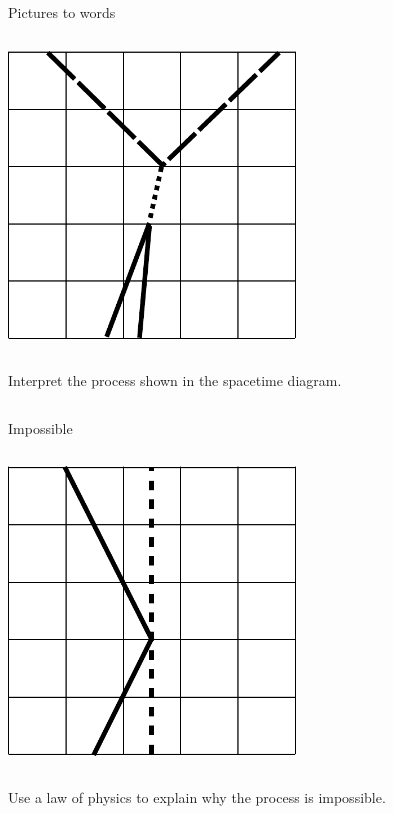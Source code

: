 \begin{frame}{Pictures to words}


  \begin{mycolumns}

    \begin{column}{.3\textwidth}\includegraphics[width=3in]{ch06/figs/to-words-3}\end{column}

    \begin{column}{.7\textwidth}

      Interpret the process shown in the spacetime diagram.

    \end{column}
  \end{mycolumns}

\end{frame}

\begin{frame}{Impossible}


  \begin{mycolumns}

    \begin{column}{.3\textwidth}\includegraphics[width=3in]{ch06/figs/impossible-1}\end{column}

    \begin{column}{.7\textwidth}

      Use a law of physics to explain why the process is impossible.

    \end{column}
  \end{mycolumns}

\end{frame}

